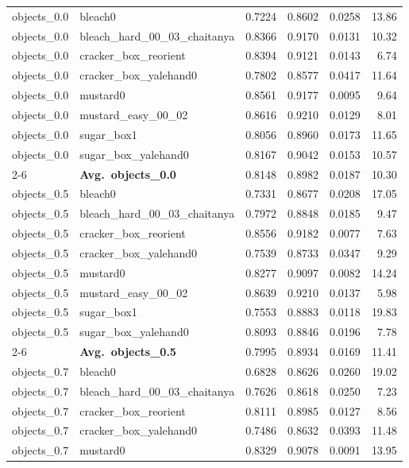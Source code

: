 \begin{longtable}{llrrrr}
\midrule
  objects_0.0 & bleach0 & 0.7224 & 0.8602 & 0.0258 & 13.86 \\
  objects_0.0 & bleach\_hard\_00\_03\_chaitanya & 0.8366 & 0.9170 & 0.0131 & 10.32 \\
  objects_0.0 & cracker\_box\_reorient & 0.8394 & 0.9121 & 0.0143 & 6.74 \\
  objects_0.0 & cracker\_box\_yalehand0 & 0.7802 & 0.8577 & 0.0417 & 11.64 \\
  objects_0.0 & mustard0 & 0.8561 & 0.9177 & 0.0095 & 9.64 \\
  objects_0.0 & mustard\_easy\_00\_02 & 0.8616 & 0.9210 & 0.0129 & 8.01 \\
  objects_0.0 & sugar\_box1 & 0.8056 & 0.8960 & 0.0173 & 11.65 \\
  objects_0.0 & sugar\_box\_yalehand0 & 0.8167 & 0.9042 & 0.0153 & 10.57 \\
  \cmidrule{2-6}
  & \textbf{Avg.~objects_0.0} & 0.8148 & 0.8982 & 0.0187 & 10.30 \\
  \midrule
  objects_0.5 & bleach0 & 0.7331 & 0.8677 & 0.0208 & 17.05 \\
  objects_0.5 & bleach\_hard\_00\_03\_chaitanya & 0.7972 & 0.8848 & 0.0185 & 9.47 \\
  objects_0.5 & cracker\_box\_reorient & 0.8556 & 0.9182 & 0.0077 & 7.63 \\
  objects_0.5 & cracker\_box\_yalehand0 & 0.7539 & 0.8733 & 0.0347 & 9.29 \\
  objects_0.5 & mustard0 & 0.8277 & 0.9097 & 0.0082 & 14.24 \\
  objects_0.5 & mustard\_easy\_00\_02 & 0.8639 & 0.9210 & 0.0137 & 5.98 \\
  objects_0.5 & sugar\_box1 & 0.7553 & 0.8883 & 0.0118 & 19.83 \\
  objects_0.5 & sugar\_box\_yalehand0 & 0.8093 & 0.8846 & 0.0196 & 7.78 \\
  \cmidrule{2-6}
  & \textbf{Avg.~objects_0.5} & 0.7995 & 0.8934 & 0.0169 & 11.41 \\
  \midrule
  objects_0.7 & bleach0 & 0.6828 & 0.8626 & 0.0260 & 19.02 \\
  objects_0.7 & bleach\_hard\_00\_03\_chaitanya & 0.7626 & 0.8618 & 0.0250 & 7.23 \\
  objects_0.7 & cracker\_box\_reorient & 0.8111 & 0.8985 & 0.0127 & 8.56 \\
  objects_0.7 & cracker\_box\_yalehand0 & 0.7486 & 0.8632 & 0.0393 & 11.48 \\
  objects_0.7 & mustard0 & 0.8329 & 0.9078 & 0.0091 & 13.95 \\

\end{longtable}
